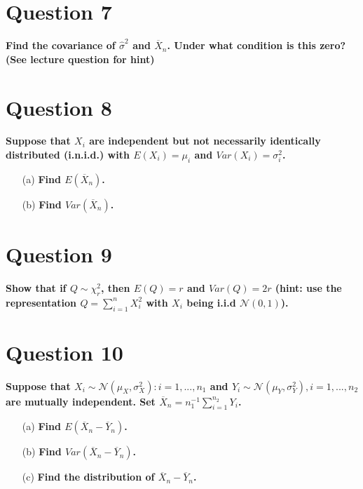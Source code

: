 \documentclass{article}
\newcommand{\N}{\mathcal{N}}
\begin{document}

\section*{Question 7}
\textbf{Find the covariance of $\hat{\sigma}^2$ and $\overline{X}_n$. Under what condition is this zero? (See lecture question for hint)}
\bigskip


\section*{Question 8}
\textbf{Suppose that $X_i$ are independent but not necessarily identically distributed (i.n.i.d.) with $E(X_i)=\mu_i$ and $Var(X_i)=\sigma_i^2$.}

\begin{itemize}
	\item[(a)] \textbf{Find $E(\overline{X}_n)$.} \\
	
	\item[(b)] \textbf{Find $Var(\overline{X}_n)$.} \\
	
\end{itemize}	


\section*{Question 9}
\textbf{Show that if $Q\sim \chi^2_r$, then $E(Q)=r$ and $Var(Q)=2r$ (hint: use the representation $Q=\sum_{i=1}^n X_i^2$ with $X_i$ being i.i.d $\N(0,1)$).}
\bigskip


\section*{Question 10}
\textbf{Suppose that $X_i\sim\N(\mu_X,\sigma^2_X):i=1,...,n_1$ and $Y_i\sim\N(\mu_Y,\sigma_Y^2),i=1,...,n_2$ are mutually independent. Set $\overline{X}_n=n_1^{-1}\sum_{i=1}^{n_2}Y_i$.}

\begin{itemize}
	\item[(a)] \textbf{Find $E(\overline{X}_n-\overline{Y}_n)$.} \\
	
	\item[(b)] \textbf{Find $Var(\overline{X}_n-\overline{Y}_n)$.} \\
	
	\item[(c)] \textbf{Find the distribution of $\overline{X}_n-\overline{Y}_n$.} \\
	
\end{itemize}	

\end{document}
